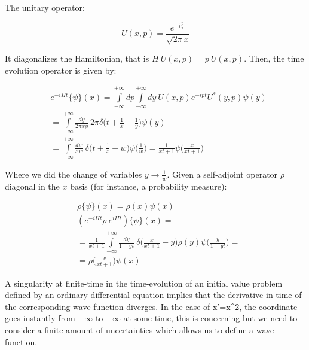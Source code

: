 \documentclass[11pt]{book}
\begin{document}
The unitary operator:

\begin{equation}U(x,p)=\frac{e^{-i \frac{p}{x}}}{\sqrt{2\pi} x }\end{equation}

It diagonalizes the Hamiltonian, that is \(H\ U(x,p)=p\ U(x,p)\). Then,
the time evolution operator is given by:

\begin{equation}\begin{aligned}
&e^{-i H t}\{\psi\}(x)=\int\limits_{-\infty}^{+\infty}dp\int\limits_{-\infty}^{+\infty}dy\ U(x,p)e^{-ip t} U^*(y,p)\psi(y)\\
&=\int\limits_{-\infty}^{+\infty}\frac{dy}{2\pi x y}\ 2\pi\delta\biggl(t+\frac{1}{x}-\frac{1}{y}\biggr)\psi(y)\\
&=\int\limits_{-\infty}^{+\infty}\frac{dw}{x w}\ \delta\biggl(t+\frac{1}{x}-w\biggr)\psi\biggl(\frac{1}{w}\biggr)=\frac{1}{x t+1}\psi\biggl(\frac{x}{x t+1}\biggr)
\end{aligned}\end{equation}

Where we did the change of variables \(y\to \frac{1}{w}\). Given a
self-adjoint operator \(\rho\) diagonal in the \(x\) basis (for
instance, a probability measure):

\begin{equation}\begin{aligned}
&\rho\{\psi\}(x)=\rho(x)\psi(x)\\
&(e^{-i H t}\rho\ e^{i H t})\{\psi\}(x)=\\
&=\frac{1}{x t+1}\int\limits_{-\infty}^{+\infty} \frac{dy}{1-y t}\ \delta\biggl(\frac{x}{x t+1}-y\biggr)\rho(y)\psi\biggl(\frac{y}{1-y t}\biggr)=\\
&=\rho\biggl(\frac{x}{x t+1}\biggr)\psi(x)
\end{aligned}\end{equation}

A singularity at finite-time in the time-evolution of an initial value
problem defined by an ordinary differential equation implies that the
derivative in time of the corresponding wave-function diverges. In the
case of x'=x\^{}2, the coordinate goes instantly from \(+\infty\) to
\(-\infty\) at some time, this is concerning but we need to consider a
finite amount of uncertainties which allows us to define a
wave-function.
\end{document}
